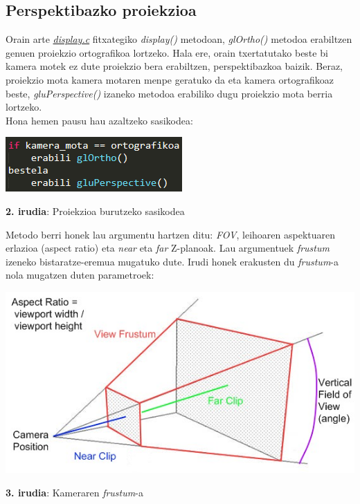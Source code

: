 \documentclass[12pt]{article}
\newcommand{\fitxategi}[1] {\underline{\textit{#1}}}
\newcommand{\metodo}[1] {\textit{#1}}
\begin{document}
\subsection{Perspektibazko proiekzioa}\label{per_proj}
Orain arte \fitxategi{display.c} fitxategiko \metodo{display()} metodoan, \metodo{glOrtho()} metodoa erabiltzen genuen proiekzio ortografikoa lortzeko. Hala ere, orain txertatutako beste bi kamera motek ez dute proiekzio bera erabiltzen, perspektibazkoa baizik. Beraz, proiekzio mota kamera motaren menpe geratuko da eta kamera ortografikoaz beste, \metodo{gluPerspective()}\cite{glu_perspective} izaneko metodoa erabiliko dugu proiekzio mota berria lortzeko.\\
Hona hemen pausu hau azaltzeko sasikodea:

\begin{center}
\includegraphics[scale=1]{kamera_projection.png}

\textbf{2. irudia}: Proiekzioa burutzeko sasikodea
\end{center}

Metodo berri honek lau argumentu hartzen ditu: \textit{FOV}, leihoaren aspektuaren erlazioa (aspect ratio)\cite{aspect_ratio} eta \textit{near} eta \textit{far} Z-planoak. Lau argumentuek \textit{frustum}\cite{frustum} izeneko bistaratze-eremua mugatuko dute. Irudi honek erakusten du \textit{frustum}-a nola mugatzen duten parametroek:

\begin{center}
\includegraphics[scale=0.8]{kamera_frustum.jpg}

\textbf{3. irudia}: Kameraren \textit{frustum}-a
\end{center}
\end{document}
